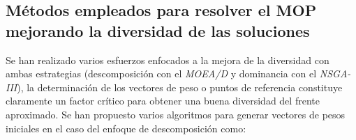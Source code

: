 \documentclass[letterpaper,10pt]{article}
\begin{document}
\subsection{Métodos empleados para resolver el MOP mejorando la diversidad de las soluciones}

Se han realizado varios esfuerzos enfocados a la mejora de la diversidad con ambas estrategias (descomposición con el \emph{MOEA/D} y dominancia con el \emph{NSGA-III}), la determinación de los vectores de peso o puntos de referencia constituye claramente un factor crítico para obtener una buena diversidad del frente aproximado. Se han propuesto varios algoritmos para generar vectores de pesos iniciales en el caso del enfoque de descomposición como:
\newline
% 
\end{document}
